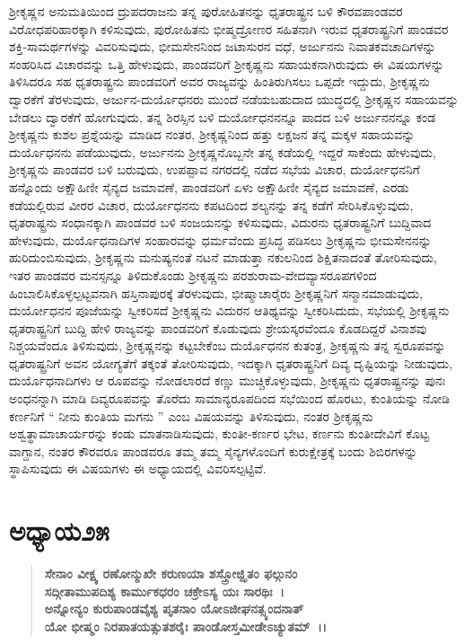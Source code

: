 ಶ‍್ರೀಕೃಷ್ಣನ ಅನುಮತಿಯಿಂದ ದ್ರುಪದರಾಜನು ತನ್ನ ಪುರೋಹಿತನನ್ನು ಧೃತರಾಷ್ಟ್ರನ ಬಳಿ ಕೌರವಪಾಂಡವರ ವಿರೋಧಪರಿಹಾರಕ್ಕಾಗಿ ಕಳಿಸುವುದು, ಪುರೋಹಿತನು ಭೀಷ್ಮದ್ರೋಣರ ಸಹಿತನಾಗಿ ಇರುವ ಧೃತರಾಷ್ಟ್ರನಿಗೆ ಪಾಂಡವರ ಶಕ್ತಿ-ಸಾಮರ್ಥಗಳನ್ನು ವಿವರಿಸುವುದು, ಭೀಮಸೇನನಿಂದ ಜಟಾಸುರನ ವಧೆ, ಅರ್ಜುನನು ನಿವಾತಕವಚಾದಿಗಳನ್ನು ಸಂಹರಿಸಿದ ವಿಚಾರವನ್ನು ಒತ್ತಿ ಹೇಳುವುದು, ಪಾಂಡವರಿಗೆ ಶ‍್ರೀಕೃಷ್ಣನು ಸಹಾಯಕನಾಗಿರುವುದು ಈ ವಿಷಯಗಳನ್ನು ತಿಳಿಸಿದರೂ ಸಹ ಧೃತರಾಷ್ಟ್ರನು ಪಾಂಡವರಿಗೆ ಅವರ ರಾಜ್ಯವನ್ನು ಹಿಂತಿರುಗಿಸಲು ಒಪ್ಪದೇ ಇದ್ದುದು, ಶ‍್ರೀಕೃಷ್ಣನು ದ್ವಾರಕೆಗೆ ತೆರಳುವುದು, ಅರ್ಜುನ-ದುರ್ಯೊಧನರು ಮುಂದೆ ನಡೆಯಬಹುದಾದ ಯುದ್ಧದಲ್ಲಿ ಶ‍್ರೀಕೃಷ್ಣನ ಸಹಾಯವನ್ನು ಬೇಡಲು ದ್ವಾರಕೆಗೆ ಹೋಗುವುದು, ತನ್ನ ಶಿರಸ್ಸಿನ ಬಳಿ ದುರ್ಯೋಧನನನ್ನೂ ಪಾದದ ಬಳಿ ಅರ್ಜುನನನ್ನೂ ಕಂಡ ಶ‍್ರೀಕೃಷ್ಣನು ಕುಶಲ ಪ್ರಶ್ನೆಯನ್ನು ಮಾಡಿದ ನಂತರ, ಶ‍್ರೀಕೃಷ್ಣನಿಂದ ಹತ್ತು ಲಕ್ಷಜನ ತನ್ನ ಮಕ್ಕಳ ಸಹಾಯವನ್ನು ದುರ್ಯೊಧನನು ಪಡೆಯುವುದು, ಅರ್ಜುನನು ಶ‍್ರೀಕೃಷ್ಣನೊಬ್ಬನೇ ತನ್ನ ಕಡೆಯಲ್ಲಿ ಇದ್ದರೆ ಸಾಕೆಂದು ಹೇಳುವುದು, ಶ‍್ರೀಕೃಷ್ಣನು ಪಾಂಡವರ ಬಳಿ ಬರುವುದು, ಉಪಪ್ಪಾವ ನಗರದಲ್ಲಿ ನಡೆದ ಸಭೆಯ ವಿಚಾರ, ದುರ್ಯೋಧನನಿಗೆ ಹನ್ನೊಂದು ಅಕ್ಷೌಹಿಣೀ ಸೈನ್ಯದ ಜಮಾವಣೆ, ಪಾಂಡವರಿಗೆ ಏಳು ಅಕ್ಷೌಹಿಣೀ ಸೈನ್ಯದ ಜಮಾವಣೆ, ಎರಡು ಕಡೆಯಲ್ಲಿರುವ ವೀರರ ವಿಚಾರ, ದುರ್ಯೋಧನನು ಕಪಟದಿಂದ ಶಲ್ಯನನ್ನು ತನ್ನ ಕಡೆಗೆ ಸೇರಿಸಿಕೊಳ್ಳುವುದು, ಧೃತರಾಷ್ಟ್ರನು ಸಂಧಾನಕ್ಕಾಗಿ ಪಾಂಡವರ ಬಳಿ ಸಂಜಯನನ್ನು ಕಳಿಸುವುದು, ವಿದುರನು ಧೃತರಾಷ್ಟ್ರನಿಗೆ ಬುದ್ದಿವಾದ ಹೇಳುವುದು, ದುರ್ಯೊಧನಾದಿಗಳ ಸಂಹಾರವನ್ನು ಧರ್ಮವೆಂದು ಪ್ರಸಿದ್ಧ ಪಡಿಸಲು ಶ‍್ರೀಕೃಷ್ಣನು ಭೀಮಸೇನನನ್ನು ಹುರಿದುಂಬಿಸುವುದು, ಶ‍್ರೀಕೃಷ್ಣನು ಮನುಷ್ಯನಂತೆ ನಟನೆ ಮಾಡುತ್ತಾ ನಕುಲನಿಂದ ಶಿಕ್ಷಿತನಾದಂತೆ ತೋರಿಸುವುದು, ಇತರ ಪಾಂಡವರ ಮನಸ್ಸನ್ನೂ ತಿಳಿದುಕೊಂಡು ಶ‍್ರೀಕೃಷ್ಣನು ಪರಶುರಾಮ-ವೇದವ್ಯಾಸರೂಪಗಳಿಂದ ಹಿಂಬಾಲಿಸಿಕೊಳ್ಳಲ್ಪಟ್ಟವನಾಗಿ ಹಸ್ತಿನಾಪುರಕ್ಕೆ ತೆರಳುವುದು, ಭೀಷ್ಮಾಚಾರೈರು ಶ‍್ರೀಕೃಷ್ಣನಿಗೆ ಸನ್ಮಾನಮಾಡುವುದು, ದುರ್ಯೋಧನನ ಪೂಜೆಯನ್ನು ಸ್ವೀಕರಿಸದೆ ಶ‍್ರೀಕೃಷ್ಣನು ವಿದುರನ ಆತಿಥ್ಯವನ್ನು ಸ್ವೀಕರಿಸಿದುದು, ಸಭೆಯಲ್ಲಿ ಶ‍್ರೀಕೃಷ್ಣನು ಧೃತರಾಷ್ಟ್ರನಿಗೆ ಬುದ್ದಿ ಹೇಳಿ ರಾಜ್ಯವನ್ನು ಪಾಂಡವರಿಗೆ ಕೊಡುವುದು ಶ್ರೇಯಸ್ಕರವೆಂದೂ ಕೊಡದಿದ್ದರೆ ವಿನಾಶವು ನಿಶ್ಚಯವೆಂದೂ ತಿಳಿಸುವುದು, ಶ‍್ರೀಕೃಷ್ಣನನ್ನು ಕಟ್ಟಬೇಕೆಂಬ ದುರ್ಯೊಧನನ ಕುತಂತ್ರ, ಶ‍್ರೀಕೃಷ್ಣನು ತನ್ನ ಸ್ವರೂಪವನ್ನು ಧೃತರಾಷ್ಟ್ರನಿಗೆ ಅವನ ಯೋಗ್ಯತೆಗೆ ತಕ್ಕಂತೆ ತೋರಿಸುವುದು, ಇದಕ್ಕಾಗಿ ಧೃತರಾಷ್ಟ್ರನಿಗೆ ದಿವ್ಯ ದೃಷ್ಟಿಯನ್ನು ನೀಡುವುದು, ದುರ್ಯೊಧನಾದಿಗಳು ಆ ರೂಪವನ್ನು ನೋಡಲಾರದೆ ಕಣ್ಣು ಮುಚ್ಚಿಕೊಳ್ಳುವುದು, ಶ‍್ರೀಕೃಷ್ಣನು ಧೃತರಾಷ್ಟ್ರನನ್ನು ಪುನಃ ಅಂಧನನ್ನಾಗಿ ಮಾಡಿ ದಿವ್ಯರೂಪವನ್ನು ತೊರೆದು ಸಾಮಾನ್ಯರೂಪದಿಂದ ಸಭೆಯಿಂದ ಹೊರಟು, ಕುಂತಿಯನ್ನು ನೋಡಿ ಕರ್ಣನಿಗೆ “ ನೀನು ಕುಂತಿಯ ಮಗನು ” ಎಂಬ ವಿಷಯವನ್ನು ತಿಳಿಸುವುದು, ನಂತರ ಶ‍್ರೀಕೃಷ್ಣನು ಅಶ್ವತ್ಥಾಮಾಚಾರ್ಯರನ್ನು ಕಂಡು ಮಾತನಾಡಿಸುವುದು, ಕುಂತೀ-ಕರ್ಣರ ಭೇಟ, ಕರ್ಣನು ಕುಂತೀದೇವಿಗೆ ಕೊಟ್ಟ ವಾಗ್ದಾನ, ನಂತರ ಕೌರವರೂ ಪಾಂಡವರೂ ತಮ್ಮ ತಮ್ಮ ಸೈನ್ಯಗಳೊಂದಿಗೆ ಕುರುಕ್ಷೇತ್ರಕ್ಕೆ ಬಂದು ಶಿಬಿರಗಳನ್ನು ಸ್ಥಾಪಿಸುವುದು ಈ ವಿಷಯಗಳು ಈ ಅಧ್ಯಾಯದಲ್ಲಿ ವಿವರಿಸಲ್ಪಟ್ಟಿವೆ.


\section*{ಅಧ್ಯಾಯ\enginline{-}೨೫}

\begin{verse}
\textbf{ಸೇನಾಂ ವೀಕ್ಷ್ಯ ರಣೋನ್ಮುಖೇ ಕರುಣಯಾ ಶಸ್ತ್ರೋಜ್ಝಿತಂ ಫಲ್ಗುನಂ}\\\textbf{ ಸದ್ಗೀತಾಮುಪದಿಶ್ಯ ಕಾರ್ಮುಕಧರಂ ಚಕ್ರೇಽಸ್ಯ ಯಃ ಸಾರಥಿಃ~।}\\\textbf{ ಅನ್ನೋನ್ಯಂ ಕುರುಪಾಂಡವೈಶ್ಯ ಪೃತನಾಂ ಯೋಽಜೀಘನತ್ಸ್ಯಂದನಾತ್ }\\\textbf{ಯೋ ಭೀಷ್ಮಂ ನಿರಪಾತಯತ್ಸುತಶರೈಃ ಪಾಂಡೋಸ್ತಮೀಡೇಽಚ್ಯುತಮ್~।।}
\end{verse}

